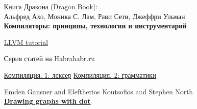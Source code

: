 \begin{thebibliography}{99}
\href{https://drive.google.com/file/d/0B0u4WeMjO894LS1Jb3JUbEVSVkE/view?usp=sharing}{Книга Дракона (Dragon Book)}:\\
Альфред Ахо, Моника С. Лам, Рави Сети, Джеффри Ульман\\
\textbf{Компиляторы: принципы, технологии и инструментарий}

 \href{http://llvm.org/docs/tutorial/}{LLVM tutorial}

Серия статей на Habrahabr.ru

 \href{http://habrahabr.ru/post/99162/}{Компиляция. 1: лексер}
 \href{http://habrahabr.ru/post/99298/}{Компиляция. 2: грамматики}

Emden Gansner and Eleftherios Koutsofios and Stephen North\\
\textbf{\href{http://www.graphviz.org/Documentation/dotguide.pdf}{Drawing graphs with dot}}

\end{thebibliography}